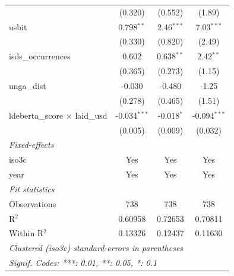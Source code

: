 \begin{tabular}{lccc}
                                         & (0.320)                                     & (0.552)                   & (1.89)\\   
   usbit                                 & 0.798$^{**}$                                & 2.46$^{***}$              & 7.03$^{***}$\\   
                                         & (0.330)                                     & (0.820)                   & (2.49)\\   
   isds\_occurrences                     & 0.602                                       & 0.638$^{**}$              & 2.42$^{**}$\\   
                                         & (0.365)                                     & (0.273)                   & (1.15)\\   
   unga\_dist                            & -0.030                                      & -0.480                    & -1.25\\   
                                         & (0.278)                                     & (0.465)                   & (1.51)\\   
   ldeberta\_score $\times$ laid\_usd    & -0.034$^{***}$                              & -0.018$^{*}$              & -0.094$^{***}$\\   
                                         & (0.005)                                     & (0.009)                   & (0.032)\\   
   \midrule
   \emph{Fixed-effects}\\
   iso3c                                 & Yes                                         & Yes                       & Yes\\  
   year                                  & Yes                                         & Yes                       & Yes\\  
   \midrule
   \emph{Fit statistics}\\
   Observations                          & 738                                         & 738                       & 738\\  
   R$^2$                                 & 0.60958                                     & 0.72653                   & 0.70811\\  
   Within R$^2$                          & 0.13326                                     & 0.12437                   & 0.11630\\  
   \midrule \midrule
   \multicolumn{4}{l}{\emph{Clustered (iso3c) standard-errors in parentheses}}\\
   \multicolumn{4}{l}{\emph{Signif. Codes: ***: 0.01, **: 0.05, *: 0.1}}\\
\end{tabular}
\par\endgroup


